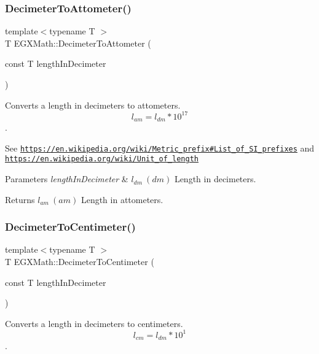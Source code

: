 \subsubsection{\texorpdfstring{Decimeter\+To\+Attometer()}{DecimeterToAttometer()}}
{\footnotesize\ttfamily template$<$typename T $>$ \\
T E\+G\+X\+Math\+::\+Decimeter\+To\+Attometer (\begin{DoxyParamCaption}\item[{const T}]{length\+In\+Decimeter }\end{DoxyParamCaption})}



Converts a length in decimeters to attometers. \[ l_{am}=l_{dm} * 10^{17} \]. 

See \href{https://en.wikipedia.org/wiki/Metric_prefix#List_of_SI_prefixes}{\tt https\+://en.\+wikipedia.\+org/wiki/\+Metric\+\_\+prefix\#\+List\+\_\+of\+\_\+\+S\+I\+\_\+prefixes} and \href{https://en.wikipedia.org/wiki/Unit_of_length}{\tt https\+://en.\+wikipedia.\+org/wiki/\+Unit\+\_\+of\+\_\+length} 
\begin{DoxyParams}{Parameters}
{\em length\+In\+Decimeter} & $ l_{dm}\ (dm)$ Length in decimeters. \\
\hline
\end{DoxyParams}
\begin{DoxyReturn}{Returns}
$ l_{am}\ (am)$ Length in attometers. 
\end{DoxyReturn}
\mbox{\label{group___e_g_x_math-_conversions-_length_conversions-_decimeter-_s_i_ga032e40ec973eb890908799b87ba41710}} 
\subsubsection{\texorpdfstring{Decimeter\+To\+Centimeter()}{DecimeterToCentimeter()}}
{\footnotesize\ttfamily template$<$typename T $>$ \\
T E\+G\+X\+Math\+::\+Decimeter\+To\+Centimeter (\begin{DoxyParamCaption}\item[{const T}]{length\+In\+Decimeter }\end{DoxyParamCaption})}



Converts a length in decimeters to centimeters. \[ l_{cm}=l_{dm} * 10^{1} \]. 

